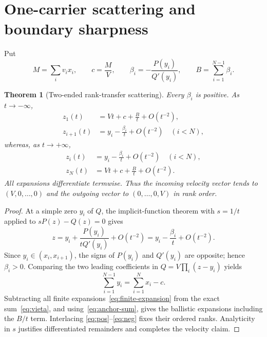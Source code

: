 \documentclass[10pt]{article}
\newtheorem{theorem}{Theorem}
\begin{document}
\section{One-carrier scattering and boundary sharpness}
Put
\begin{equation}\label{eq:data}
 M=\sum_i v_ix_i,\qquad c=\frac MV,\qquad
 \beta_i=-\frac{P(y_i)}{Q'(y_i)},\qquad B=\sum_{i=1}^{N-1}\beta_i.
\end{equation}
\begin{theorem}[Two-ended rank-transfer scattering]\label{thm:scatter}
Every $\beta_i$ is positive.  As $t\to-\infty$,
\begin{align}
 z_1(t)&=Vt+c+\frac Bt+O(t^{-2}),\label{eq:ballminus}\\
 z_{i+1}(t)&=y_i-\frac{\beta_i}{t}+O(t^{-2})\quad(i<N),
 \label{eq:finminus}
\end{align}
whereas, as $t\to+\infty$,
\begin{align}
 z_i(t)&=y_i-\frac{\beta_i}{t}+O(t^{-2})\quad(i<N),
 \label{eq:finplus}\\
 z_N(t)&=Vt+c+\frac Bt+O(t^{-2}).\label{eq:ballplus}
\end{align}
All expansions differentiate termwise.  Thus the incoming velocity vector
tends to $(V,0,\ldots,0)$ and the outgoing vector to
$(0,\ldots,0,V)$ in rank order.
\end{theorem}

\begin{proof}
At a simple zero $y_i$ of $Q$, the implicit-function theorem with
$s=1/t$ applied to $sP(z)-Q(z)=0$ gives
\begin{equation}\label{eq:finite-expansion}
 z=y_i+\frac{P(y_i)}{tQ'(y_i)}+O(t^{-2})
   =y_i-\frac{\beta_i}{t}+O(t^{-2}).
\end{equation}
Since $y_i\in(x_i,x_{i+1})$, the signs of $P(y_i)$ and $Q'(y_i)$ are
opposite; hence $\beta_i>0$.  Comparing the two leading coefficients in
$Q=V\prod_i(z-y_i)$ yields
\begin{equation}\label{eq:anchor-sum}
 \sum_{i=1}^{N-1}y_i=\sum_{i=1}^Nx_i-c.
\end{equation}
Subtracting all finite expansions~\eqref{eq:finite-expansion} from the
exact sum~\eqref{eq:vieta}, and using~\eqref{eq:anchor-sum}, gives the
ballistic expansions including the $B/t$ term.  Interlacing
\eqref{eq:pos}--\eqref{eq:neg} fixes their ordered ranks.  Analyticity in
$s$ justifies differentiated remainders and completes the velocity claim.
\end{proof}
\end{document}
